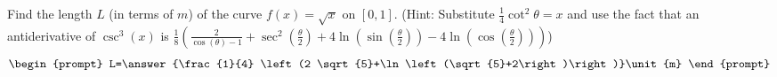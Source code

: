 \documentclass{ximera}
\author{Gregory Hartman \and Matthew Carr}
\begin{document}
\begin{exercise}





Find the length $L$ (in terms of $\unit{m}$) of the curve $f(x)=\sqrt{x}$ on $[0,1]$. (Hint: Substitute $\frac{1}{4}\cot^{2}\theta=x$ and use the fact that an antiderivative of $\csc^{3}(x)$ is $\frac{1}{8} \left(\frac{2}{\cos (\theta )-1}+\sec ^2\left(\frac{\theta }{2}\right)+4 \ln\left(\sin \left(\frac{\theta }{2}\right)\right)-4 \ln\left(\cos \left(\frac{\theta }{2}\right)\right)\right)$)
\[
\begin{prompt}
L=\answer{\frac{1}{4} \left(2 \sqrt{5}+\ln\left(\sqrt{5}+2\right)\right)}\unit{m}
\end{prompt}
\]


\end{exercise}
\end{document}
